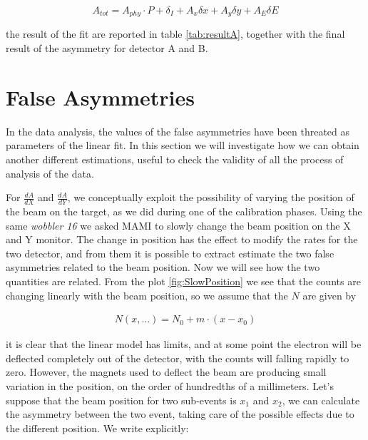 \begin{equation} \label{eq:ModelloUsato}
A_{tot} = A_{phy} \cdot P + \delta_{I} + A_{x} \delta x + A_{y} \delta y + A_{E} \delta E 
\end{equation}


the result of the fit are reported in table \ref{tab:resultA}, together with the final result of the asymmetry for detector A and B.



\section{False Asymmetries}

In the data analysis, the values of the false asymmetries have been threated as parameters of the linear fit. In this section we will investigate how we can obtain another different estimations, useful to check the validity of all the process of analysis of the data.

For $\frac{dA}{dX}$ and $\frac{dA}{dY}$, we conceptually exploit the possibility of varying the position of the beam on the target, as we did during one of the calibration phases. Using the same \textit{wobbler 16} we asked MAMI to slowly change the beam position on the X and Y monitor. The change in position has the effect to modify the rates for the two detector, and from them it is possible to extract estimate the two false asymmetries related to the beam position. Now we will see how the two quantities are related.
From the plot \ref{fig:SlowPosition} we see that the counts are changing linearly with the beam position, so we assume that the $N$ are given by

\begin{align*}
N(x,...) = N_{0} + m \cdot (x - x_{0})
\end{align*}

it is clear that the linear model has limits, and at some point the electron will be deflected completely out of the detector, with the counts will falling rapidly to zero. However, the magnets used to deflect the beam are producing small variation in the position, on the order of hundredths of a millimeters.
Let's suppose that the beam position for two sub-events is $x_{1}$ and $x_{2}$, we can calculate the asymmetry between the two event, taking care of the possible effects due to the different position. We write explicitly: 

